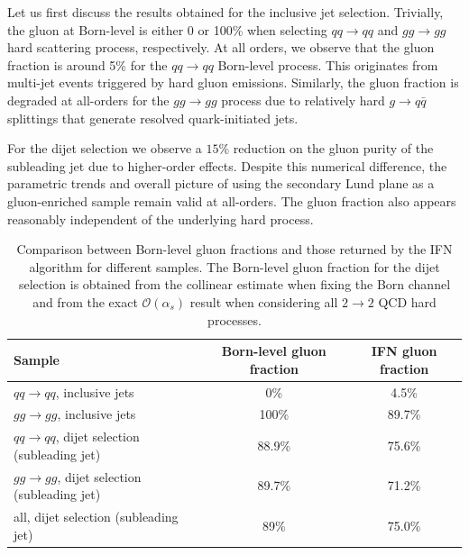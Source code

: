 \documentclass[a4paper,11pt]{article}
\begin{document}
Let us first discuss the results obtained for the inclusive jet selection. Trivially, the gluon at Born-level is either 0 or 100\% when selecting $qq\to qq$ and $gg\to gg$ hard scattering process, respectively. At all orders, we observe that the gluon fraction is around 5\% for the $qq\to qq$ Born-level process. This originates from multi-jet events triggered by hard gluon emissions. Similarly, the gluon fraction is degraded at all-orders for the $gg\to gg$ process due to relatively hard $g\to q\bar q$ splittings that generate resolved quark-initiated jets.   

For the dijet selection we observe a $15\%$ reduction on the gluon purity of the subleading jet due to higher-order effects. Despite this numerical difference, the parametric trends and overall picture of using the secondary Lund plane as a gluon-enriched sample remain valid at all-orders. The gluon fraction also appears reasonably independent of the underlying hard process.
\begin{table}[h!]
\centering
\begin{tabular}{l|c|c|}
  Sample  & Born-level gluon fraction & IFN gluon fraction \\
  \hline
  $qq\to qq$, inclusive jets &   0\% &  4.5\% \\
  $gg\to gg$, inclusive jets & 100\% & 89.7\% \\
  \hline
  $qq\to qq$, dijet selection (subleading jet) & 88.9\% & 75.6\% \\
  $gg\to gg$, dijet selection (subleading jet) & 89.7\% & 71.2\% \\
  all,   dijet selection (subleading jet) & 89\% & 75.0\% \\
\end{tabular}
\caption{Comparison between Born-level gluon fractions and those returned by the IFN algorithm for different samples. The Born-level gluon fraction for the dijet selection is obtained from the collinear estimate when fixing the Born channel and from the exact $\mathcal{O}(\alpha_s)$ result when considering all $2\to 2$ QCD hard processes.}
\label{table:ifn-results}
\end{table}
\end{document}
